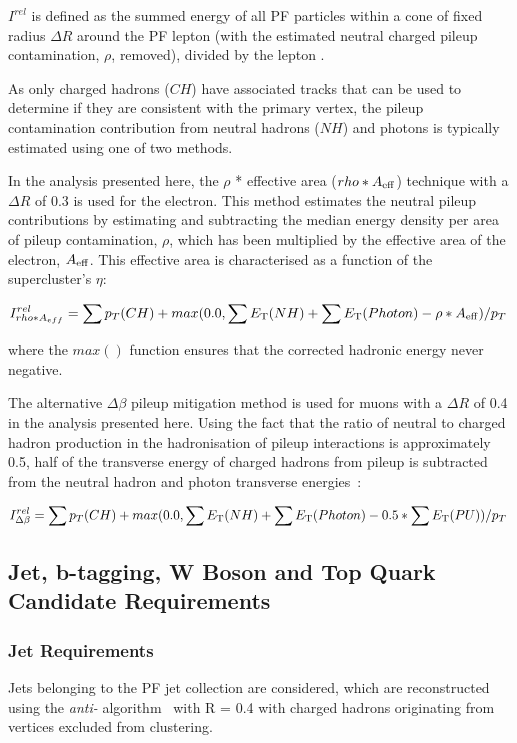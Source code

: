 $I^{rel}$ is defined as the summed energy of all PF particles within a cone of fixed radius $\Delta R$ around the PF lepton (with the estimated neutral charged pileup contamination, $\rho$, removed), divided by the lepton \pT.

As only charged hadrons ($CH$) have associated tracks that can be used to determine if they are consistent with the primary vertex, the pileup contamination contribution from neutral hadrons ($NH$) and photons is typically estimated using one of two methods.

In the analysis presented here,  the $\rho$ * effective area ($rho * A_{\rm eff}$) technique with a $\Delta R$ of 0.3 is used for the electron.
This method estimates the neutral pileup contributions by estimating and subtracting the median energy density per area of pileup contamination, $\rho$, which has been multiplied by the effective area of the electron, $A_{\rm eff}$.
This effective area is characterised as a function of the supercluster's $\eta$:

\begin{equation}
I^{rel}_{rho * A_{eff}} = \sum p_T(CH) + max (0.0, \sum E_{\rm T}(NH) + \sum E_{\rm T}(Photon) -\rho*A_{\rm eff} )/p_T \;
\end{equation}\label{eq:rhoEffA}

where the $max()$ function ensures that the corrected hadronic energy never negative.

The alternative $\Delta\beta$ pileup mitigation method is used for muons with a $\Delta R$ of 0.4 in the analysis presented here.
Using the fact that the ratio of neutral to charged hadron production in the hadronisation of pileup interactions is approximately 0.5, half of the transverse energy of charged hadrons from pileup is subtracted from the neutral hadron and photon transverse energies~\cite{Chatrchyan:2012vp}:

\begin{equation}
I^{rel}_{\Delta\beta} = \sum p_T(CH) + max (0.0, \sum E_{\rm T}(NH) + \sum E_{\rm T}(Photon) - 0.5 * \sum E_{\rm T}(PU))/p_T \;
\end{equation}\label{eq:deltaBeta}

\subsection{Jet, b-tagging, W Boson and Top Quark Candidate Requirements}
\subsubsection{Jet Requirements}
Jets belonging to the PF jet collection are considered, which are reconstructed using the \emph{anti-\kt} algorithm~\cite{Cacciari:2008gp} with R = 0.4 with charged hadrons originating from \PU vertices excluded from clustering.

